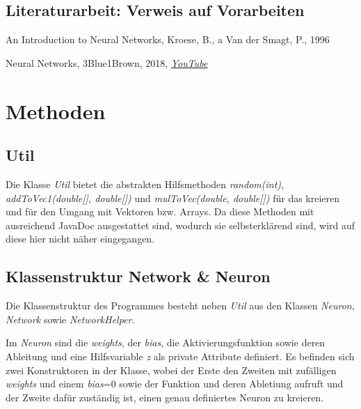 \documentclass[paper=A4,pagesize=auto,12pt,headinclude=true,footinclude=true,BCOR=0mm,DIV=calc]{scrartcl}
\begin{document}
	\subsection{Literaturarbeit: Verweis auf Vorarbeiten}
	\begin{itemize}
		\item{An Introduction to Neural Networks, Kroese, B., a Van der Smagt, P., 1996}
		\hypertarget{3b1b}{\item{Neural Networks, 3Blue1Brown, 2018, \hyperref{https://www.youtube.com/playlist?list=PLZHQObOWTQDNU6R1_67000Dx_ZCJB-3pi}{}{}{\textit{YouTube}}}}
	\end{itemize}
	
	
	\newpage
	
	
	\section{Methoden}
	
	\subsection{Util}
	Die Klasse \textit{Util} bietet die abstrakten Hilfsmethoden \textit{random(int)}, \textit{addToVec1(double[], double[])} und \textit{mulToVec(double, double[])} für das kreieren und für den Umgang mit Vektoren bzw. Arrays. Da diese Methoden mit ausreichend JavaDoc ausgestattet sind, wodurch sie selbsterklärend sind, wird auf diese hier nicht näher eingegangen.
	
	
	\subsection{Klassenstruktur Network \& Neuron} %
	Die Klassenstruktur des Programmes besteht neben \textit{Util} aus den Klassen \textit{Neuron}, \textit{Network} sowie \textit{NetworkHelper}.
	
	Im \textit{Neuron} sind die \textit{weights}, der \textit{bias}, die Aktivierungsfunktion sowie deren Ableitung und eine Hilfsvariable \textit{z} als private Attribute definiert.
	Es befinden sich zwei Konstruktoren in der Klasse, wobei der Erste den Zweiten mit zufälligen \textit{weights} und einem \textit{bias}=0 sowie der Funktion und deren Abletiung aufruft und der Zweite dafür zuständig ist, einen genau definiertes Neuron zu kreieren.
	
\end{document}

